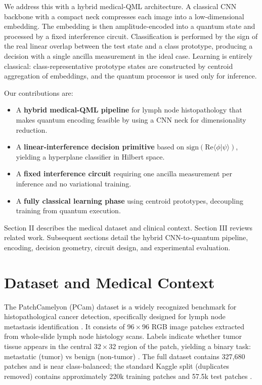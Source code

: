 \documentclass[conference]{IEEEtran}
\begin{document}
We address this with a hybrid medical-QML architecture. A classical CNN backbone with a compact neck compresses each image into a low-dimensional embedding. The embedding is then amplitude-encoded into a quantum state and processed by a fixed interference circuit. Classification is performed by the sign of the real linear overlap between the test state and a class prototype, producing a decision with a single ancilla measurement in the ideal case. Learning is entirely classical: class-representative prototype states are constructed by centroid aggregation of embeddings, and the quantum processor is used only for inference.

Our contributions are:
\begin{itemize}
    \item A \textbf{hybrid medical-QML pipeline} for lymph node histopathology that makes quantum encoding feasible by using a CNN neck for dimensionality reduction.
    \item A \textbf{linear-interference decision primitive} based on $\mathrm{sign}(\mathrm{Re}\langle\phi|\psi\rangle)$, yielding a hyperplane classifier in Hilbert space.
    \item A \textbf{fixed interference circuit} requiring one ancilla measurement per inference and no variational training.
    \item A \textbf{fully classical learning phase} using centroid prototypes, decoupling training from quantum execution.
\end{itemize}

Section II describes the medical dataset and clinical context. Section III reviews related work. Subsequent sections detail the hybrid CNN-to-quantum pipeline, encoding, decision geometry, circuit design, and experimental evaluation.

\section{Dataset and Medical Context}

The PatchCamelyon (PCam) dataset is a widely recognized benchmark for histopathological cancer detection, specifically designed for lymph node metastasis identification \cite{pcam_01,pcam_03,pcam_04}. It consists of 96\,$\times$\,96 RGB image patches extracted from whole-slide lymph node histology scans. Labels indicate whether tumor tissue appears in the central 32\,$\times$\,32 region of the patch, yielding a binary task: metastatic (tumor) vs benign (non-tumor) \cite{pcam_04}. The full dataset contains 327{,}680 patches and is near class-balanced; the standard Kaggle split (duplicates removed) contains approximately 220k training patches and 57.5k test patches \cite{pcam_03,pcam_04}.
\end{document}
